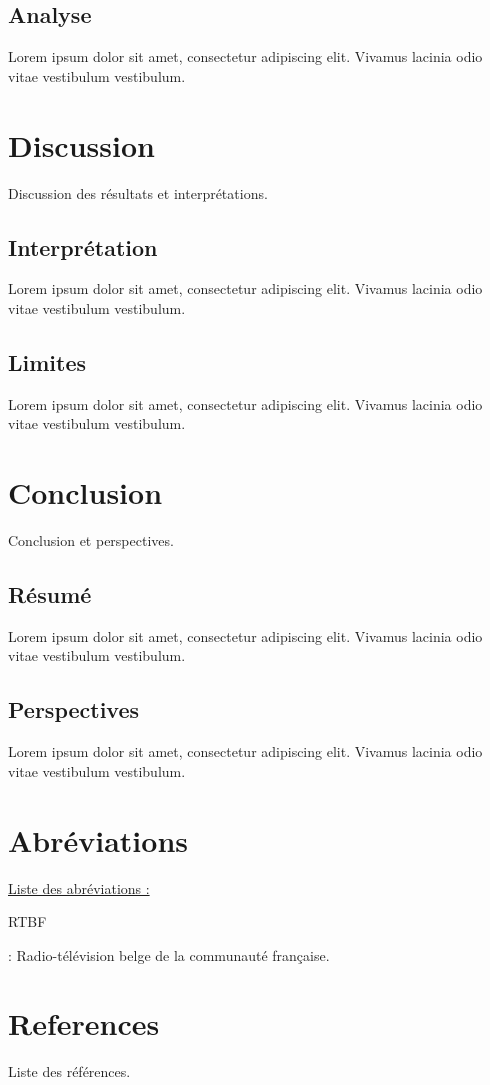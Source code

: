 \documentclass[a4paper, 12pt]{article}
\begin{document}
\subsection{Analyse}
Lorem ipsum dolor sit amet, consectetur adipiscing elit. Vivamus lacinia odio vitae vestibulum vestibulum.

\newpage
\section{Discussion}
Discussion des résultats et interprétations.

\subsection{Interprétation}
Lorem ipsum dolor sit amet, consectetur adipiscing elit. Vivamus lacinia odio vitae vestibulum vestibulum.

\subsection{Limites}
Lorem ipsum dolor sit amet, consectetur adipiscing elit. Vivamus lacinia odio vitae vestibulum vestibulum.

\newpage
\section{Conclusion}
Conclusion et perspectives.

\subsection{Résumé}
Lorem ipsum dolor sit amet, consectetur adipiscing elit. Vivamus lacinia odio vitae vestibulum vestibulum.

\subsection{Perspectives}
Lorem ipsum dolor sit amet, consectetur adipiscing elit. Vivamus lacinia odio vitae vestibulum vestibulum.

\newpage
\section{Abréviations}
\underline  {Liste des abréviations :} 

\hypertarget{RTBF}{RTBF} : Radio-télévision belge de la communauté française.

\newpage

\section{References}
Liste des références.
\end{document}
